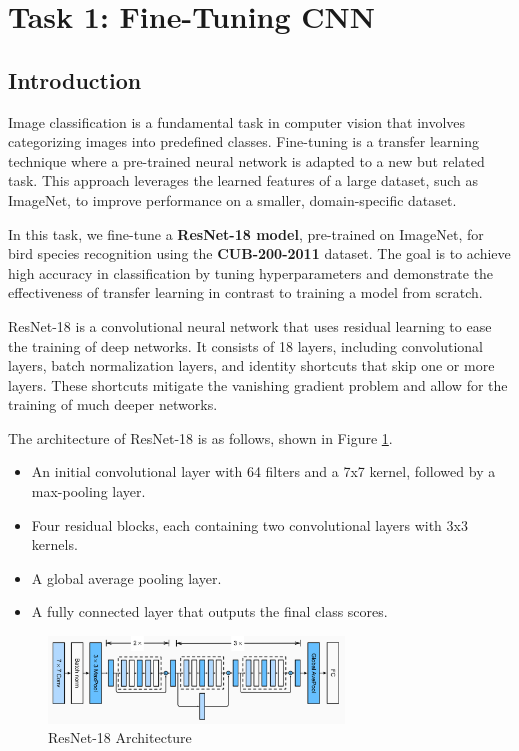\documentclass[UTF8]{ctexart}
\begin{document}
\section{Task 1: Fine-Tuning CNN}

\subsection{Introduction}
Image classification is a fundamental task in computer vision that involves categorizing images into predefined classes.
Fine-tuning is a transfer learning technique where a pre-trained neural network is adapted to a new but related task. 
This approach leverages the learned features of a large dataset, such as ImageNet, to improve performance on a smaller, domain-specific dataset.

In this task, we fine-tune a \textbf{ResNet-18 model}, pre-trained on ImageNet, for bird species recognition using the \textbf{CUB-200-2011} dataset. 
The goal is to achieve high accuracy in classification by tuning hyperparameters and demonstrate the effectiveness of transfer learning in contrast to training a model from scratch.

ResNet-18 is a convolutional neural network that uses residual learning to ease the training of deep networks. It consists of 18 layers, including convolutional layers, batch normalization layers, and identity shortcuts that skip one or more layers. These shortcuts mitigate the vanishing gradient problem and allow for the training of much deeper networks.

The architecture of ResNet-18 is as follows, shown in Figure \ref{fig:network}.
\begin{itemize}
    \item An initial convolutional layer with 64 filters and a 7x7 kernel, followed by a max-pooling layer.
    \item Four residual blocks, each containing two convolutional layers with 3x3 kernels.
    \item A global average pooling layer.
    \item A fully connected layer that outputs the final class scores.
\end{itemize}

\begin{figure}[H]
    \centering
    \includegraphics[width=0.7\textwidth]{./figs/resnet18.png}
    \caption{ResNet-18 Architecture}
    \label{fig:network}
\end{figure}
\end{document}
